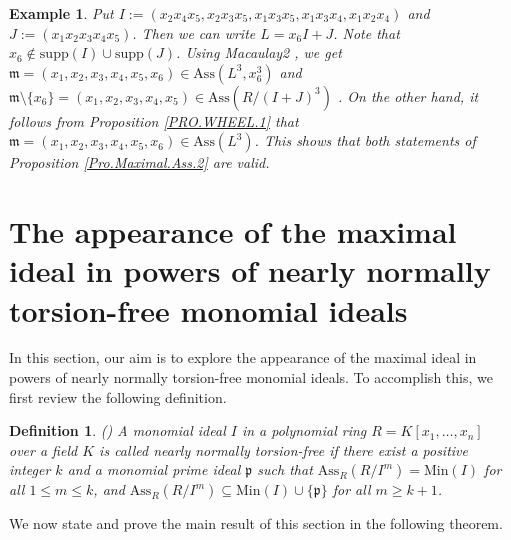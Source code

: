 \documentclass[11pt]{amsart}
\newtheorem{definition}[theorem]{Definition}
\newtheorem{example}[theorem]{Example}
\begin{document}
\begin{example}
{Put $I:=(x_2x_4x_5,x_2x_3x_5,x_1x_3x_5,x_1x_3x_4,x_1x_2x_4)$ and $J:=(x_1x_2x_3x_4x_5)$. Then we can write $L=x_6I+J$. 
Note that $x_6\notin \mathrm{supp}(I) \cup \mathrm{supp}(J)$. Using {\it Macaulay2} \cite{GS}, we get 
$\mathfrak{m}=(x_1,x_2,x_3,x_4,x_5,x_6)\in \mathrm{Ass}(L^3, x_6^3)$ and 
$\mathfrak{m}\setminus\{x_6\}=(x_1,x_2,x_3,x_4,x_5)\in \mathrm{Ass}(R/(I+J)^3)$ . 
On the other hand, it follows from Proposition \ref{PRO.WHEEL.1} that $\mathfrak{m}=(x_1,x_2,x_3,x_4,x_5,x_6)\in \mathrm{Ass}(L^3)$. 
This shows that both statements of Proposition \ref{Pro.Maximal.Ass.2}   are valid.
}
\end{example}



\section{The appearance of the maximal ideal  in powers of nearly normally torsion-free monomial ideals}\label{Section4}


 In this section, our aim is to explore the appearance of the maximal ideal in powers of nearly normally torsion-free monomial ideals. To accomplish this, we first review the following definition.

\begin{definition} (\cite[Definition 2.1]{Claudia})
A monomial ideal $I$ in a polynomial  ring $R=K[x_1, \ldots, x_n]$ over a field $K$ is called {\it nearly normally torsion-free}
  if there exist a positive integer $k$ and a monomial prime ideal
 $\mathfrak{p}$ such that $\mathrm{Ass}_R(R/I^m)=\mathrm{Min}(I)$ for all $1\leq m\leq k$, and 
 $\mathrm{Ass}_R(R/I^m) \subseteq \mathrm{Min}(I) \cup \{\mathfrak{p}\}$ for all $m \geq k+1$.
\end{definition}



We now state and prove the main result of this section in the following theorem.
\end{document}
